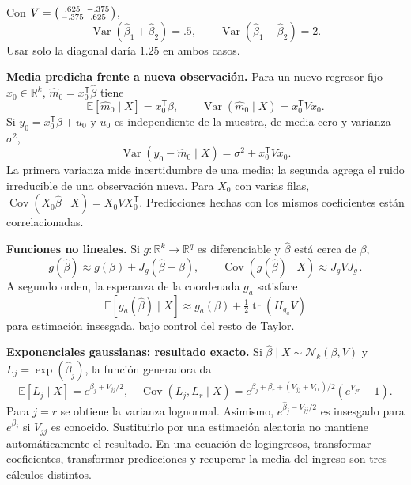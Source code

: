 \documentclass[11pt,a4paper]{article}
\newcommand{\R}{\mathbb R}
\newcommand{\E}{\mathbb E}
\newcommand{\T}{^{\mathsf T}}
\DeclareMathOperator{\Var}{Var}
\DeclareMathOperator{\Cov}{Cov}
\DeclareMathOperator{\tr}{tr}
\newcommand{\Normal}{\mathcal N}
\theoremstyle{definition}\newtheorem{definicion}[teorema]{Definición}
\begin{document}
\begin{ejemplo}
Con
$V=\begin{psmallmatrix}.625&-.375\\-.375&.625\end{psmallmatrix}$,
\[
\Var(\widehat\beta_1+\widehat\beta_2)=.5,\qquad
\Var(\widehat\beta_1-\widehat\beta_2)=2.
\]
Usar solo la diagonal daría $1.25$ en ambos casos.
\end{ejemplo}
\textbf{Media predicha frente a nueva observación.}
Para un nuevo regresor fijo $x_0\in\R^k$,
$\widehat m_0=x_0\T\widehat\beta$ tiene
\[
\E[\widehat m_0\mid X]=x_0\T\beta,\qquad
\Var(\widehat m_0\mid X)=x_0\T Vx_0.
\]
Si $y_0=x_0\T\beta+u_0$ y $u_0$ es independiente de la muestra,
de media cero y varianza $\sigma^2$,
\[
\Var(y_0-\widehat m_0\mid X)=\sigma^2+x_0\T Vx_0.
\]
La primera varianza mide incertidumbre de una media; la segunda agrega
el ruido irreducible de una observación nueva.
Para $X_0$ con varias filas,
$\Cov(X_0\widehat\beta\mid X)=X_0VX_0\T$.
Predicciones hechas con los mismos coeficientes están correlacionadas.

\textbf{Funciones no lineales.}
Si $g:\R^k\to\R^q$ es diferenciable y $\widehat\beta$ está cerca de
$\beta$,
\[
g(\widehat\beta)\approx g(\beta)+J_g(\widehat\beta-\beta),
\qquad \Cov(g(\widehat\beta)\mid X)\approx J_gVJ_g\T.
\]
A segundo orden, la esperanza de la coordenada $g_a$ satisface
\[
\E[g_a(\widehat\beta)\mid X]\approx
g_a(\beta)+\tfrac12\tr(H_{g_a}V)
\]
para estimación insesgada, bajo control del resto de Taylor.

\textbf{Exponenciales gaussianas: resultado exacto.}
Si $\widehat\beta\mid X\sim\Normal_k(\beta,V)$ y
$L_j=\exp(\widehat\beta_j)$, la función generadora da
\[
\E[L_j\mid X]=e^{\beta_j+V_{jj}/2},
\quad
\boxed{\Cov(L_j,L_r\mid X)=
e^{\beta_j+\beta_r+(V_{jj}+V_{rr})/2}(e^{V_{jr}}-1)}.
\]
Para $j=r$ se obtiene la varianza lognormal.
Asimismo, $e^{\widehat\beta_j-V_{jj}/2}$ es insesgado para $e^{\beta_j}$
si $V_{jj}$ es conocido. Sustituirlo por una estimación aleatoria no
mantiene automáticamente el resultado.
En una ecuación de logingresos, transformar coeficientes, transformar
predicciones y recuperar la media del ingreso son tres cálculos distintos.
\end{document}
